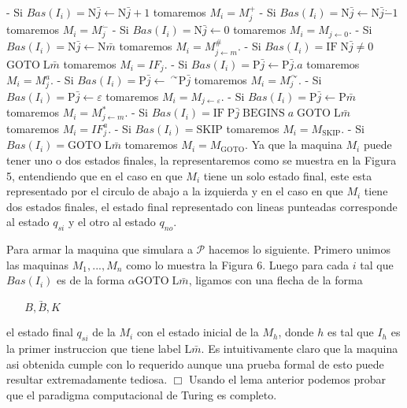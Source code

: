 - Si \(Bas(I_{i})=\mathrm{N}\bar{j}\leftarrow \mathrm{N}\bar{j}+1\) tomaremos \(M_{i}=M_{j}^{+}\)
- Si \(Bas(I_{i})=\mathrm{N}\bar{j}\leftarrow \mathrm{N}\bar{j}\dot{-} 1 \) tomaremos \(M_{i}=M_{j}^{\dot{-}}\)
- Si \(Bas(I_{i})=\mathrm{N}\bar{j}\leftarrow 0\) tomaremos \( M_{i}=M_{j\leftarrow 0}\).
- Si \(Bas(I_{i})=\mathrm{N}\bar{j}\leftarrow \mathrm{N}\bar{m}\) tomaremos \(M_{i}=M_{j\leftarrow m}^{\#}\).
- Si \(Bas(I_{i})=\mathrm{IF}\;\mathrm{N}\bar{j}\not=0\) \(\mathrm{GOTO} \;\mathrm{L}\bar{m}\) tomaremos \(M_{i}=IF_{j}.\)
- Si \(Bas(I_{i})=\mathrm{P}\bar{j}\leftarrow \mathrm{P}\bar{j}.a\) tomaremos \(M_{i}=M_{j}^{a}\).
- Si \(Bas(I_{i})=\mathrm{P}\bar{j}\leftarrow \ ^{\curvearrowright } \mathrm{P}\bar{j}\) tomaremos \(M_{i}=M_{j}^{\curvearrowright }\).
- Si \(Bas(I_{i})=\mathrm{P}\bar{j}\leftarrow \varepsilon \) tomaremos \( M_{i}=M_{j\leftarrow \varepsilon }\).
- Si \(Bas(I_{i})=\mathrm{P}\bar{j}\leftarrow \mathrm{P}\bar{m}\) tomaremos \(M_{i}=M_{j\leftarrow m}^{\ast }\).
- Si \(Bas(I_{i})=\mathrm{IF}\;\mathrm{P}\bar{j}\;\mathrm{BEGINS}\;a\; \mathrm{GOTO}\;\mathrm{L}\bar{m}\) tomaremos \(M_{i}=IF_{j}^{a}\).
- Si \(Bas(I_{i})=\mathrm{SKIP}\) tomaremos \(M_{i}=M_{\mathrm{SKIP}}\).
- Si \(Bas(I_{i})=\mathrm{GOTO}\;\mathrm{L}\bar{m}\) tomaremos \( M_{i}=M_{\mathrm{GOTO}}\).
Ya que la maquina \(M_{i}\) puede tener uno o dos estados finales, la representaremos como se muestra en la Figura 5, entendiendo que en el caso en que \(M_{i}\) tiene un solo estado final, este esta representado por el circulo de abajo a la izquierda y en el caso en que \(M_{i}\) tiene dos estados finales, el estado final representado con lineas punteadas corresponde al estado \(q_{si}\) y el otro al estado \(q_{no}\).

Para armar la maquina que simulara a \(\mathcal{P}\) hacemos lo siguiente. Primero unimos las maquinas \(M_{1},...,M_{n}\) como lo muestra la Figura 6. Luego para cada \(i\) tal que \(Bas(I_{i})\) es de la forma \(\alpha \mathrm{GOTO} \;\mathrm{L}\bar{m}\), ligamos con una flecha de la forma

\(\displaystyle \underrightarrow{\;\;\;\;\;\;B,B,K\;\;\;\;\;\;} \)

el estado final \(q_{si}\) de la \(M_{i}\) con el estado inicial de la \(M_{h}\), donde \(h\) es tal que \(I_{h}\) es la primer instruccion que tiene label \( \mathrm{L}\bar{m}\).
Es intuitivamente claro que la maquina asi obtenida cumple con lo requerido aunque una prueba formal de esto puede resultar extremadamente tediosa. \(\Box\)
Usando el lema anterior podemos probar que el paradigma computacional de Turing es completo.




